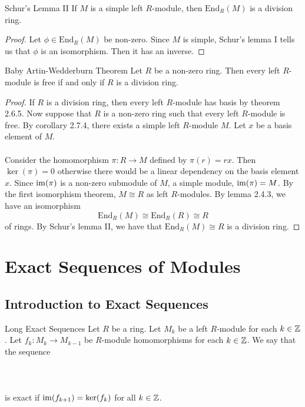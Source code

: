 \documentclass[a4paper]{article}
\begin{document}
\begin{crl}{Schur's Lemma II}{} If $M$ is a simple left $R$-module, then $\text{End}_R(M)$ is a division ring. \tcbline
\begin{proof}
Let $\phi\in\text{End}_R(M)$ be non-zero. Since $M$ is simple, Schur's lemma I tells us that $\phi$ is an isomorphism. Then it has an inverse. 
\end{proof}
\end{crl}

\begin{thm}{Baby Artin-Wedderburn Theorem}{} Let $R$ be a non-zero ring. Then every left $R$-module is free if and only if $R$ is a division ring. \tcbline
\begin{proof}
If $R$ is a division ring, then every left $R$-module has basis by theorem 2.6.5. Now suppose that $R$ is a non-zero ring such that every left $R$-module is free. By corollary 2.7.4, there exists a simple left $R$-module $M$. Let $x$ be a basis element of $M$. \\~\\

Consider the homomorphism $\pi:R\to M$ defined by $\pi(r)=rx$. Then $\ker(\pi)=0$ otherwise there would be a linear dependency on the basis element $x$. Since $\operatorname{im}(\pi)$ is a non-zero submodule of $M$, a simple module, $\operatorname{im}(\pi)=M$. By the first isomorphism theorem, $M\cong R$ as left $R$-modules. By lemma 2.4.3, we have an isomorphism $$\text{End}_R(M)\cong\text{End}_R(R)\cong R$$ of rings. By Schur's lemma II, we have that $\text{End}_R(M)\cong R$ is a division ring. 
\end{proof}
\end{thm}

\pagebreak
\section{Exact Sequences of Modules}
\subsection{Introduction to Exact Sequences}
\begin{defn}{Long Exact Sequences}{} Let $R$ be a ring. Let $M_k$ be a left $R$-module for each $k\in\mathbb{Z}$. Let $f_k:M_k\to M_{k-1}$ be $R$-module homomorphisms for each $k\in\mathbb{Z}$. We say that the sequence \\~\\
\\~\\
is exact if $\operatorname{im}(f_{k+1})=\ker(f_k)$ for all $k\in\mathbb{Z}$. 
\end{defn}
\end{document}
